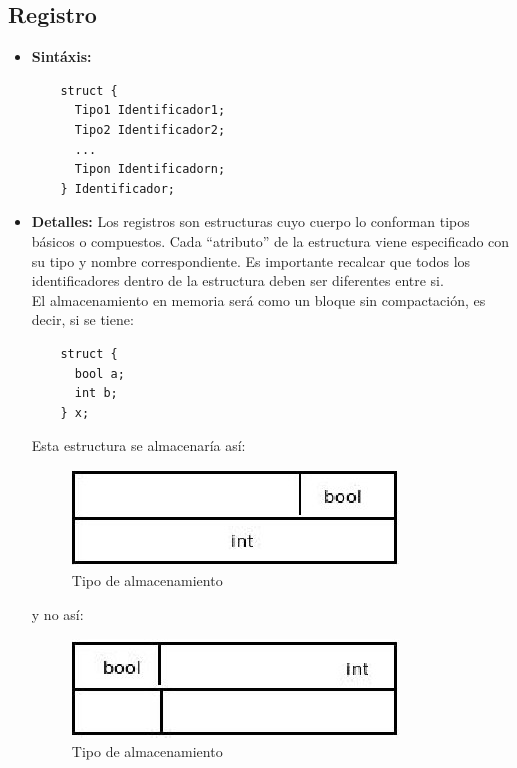 \documentclass[11pt, spanish]{report}
\begin{document}
\subsection{Registro}
\begin{itemize}
\item \textbf{Sint\'axis:}
  \begin{verbatim}
    struct {
      Tipo1 Identificador1;
      Tipo2 Identificador2;
      ...
      Tipon Identificadorn;
    } Identificador;
  \end{verbatim}
\item \textbf{Detalles:}
  Los registros son estructuras cuyo cuerpo lo conforman tipos b\'asicos o compuestos. Cada ``atributo'' de la estructura viene especificado con su tipo y 
  nombre correspondiente. Es importante recalcar que todos los identificadores dentro de la estructura deben ser diferentes entre si.\\

  El almacenamiento en memoria ser\'a como un bloque sin compactaci\'on, es decir, si se tiene:

  \begin{verbatim}
    struct { 
      bool a; 
      int b; 
    } x; 
  \end{verbatim}

  Esta estructura se almacenar\'ia as\'i:\\

  \begin{figure}[!htp]
    \centering
    \mbox{\includegraphics[scale=0.5]{memoria1.jpg}}
    \caption{Tipo de almacenamiento}
    \label{fig memoria1}
  \end{figure}

  y no as\'i:

  \begin{figure}[!htp]
    \centering
    \mbox{\includegraphics[scale=0.5]{memoria2.jpg}}
    \caption{Tipo de almacenamiento}
    \label{fig memoria2}
  \end{figure}
  

\end{itemize}
\end{document}
